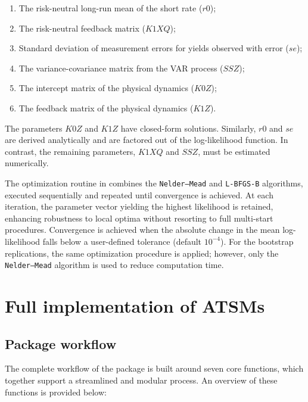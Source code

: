 \begin{enumerate}
\def\labelenumi{\arabic{enumi}.}
\item
  The risk-neutral long-run mean of the short rate (\(r0\));
\item
  The risk-neutral feedback matrix (\(K1XQ\));
\item
  Standard deviation of measurement errors for yields observed with error (\(se\));
\item
  The variance-covariance matrix from the VAR process (\(SSZ\));
\item
  The intercept matrix of the physical dynamics (\(K0Z\));
\item
  The feedback matrix of the physical dynamics (\(K1Z\)).
\end{enumerate}

The parameters \(K0Z\) and \(K1Z\) have closed-form solutions. Similarly, \(r0\) and \(se\) are derived analytically and are factored out of the log-likelihood function. In contrast, the remaining parameters, \(K1XQ\) and \(SSZ\), must be estimated numerically.

The optimization routine in  combines the \texttt{Nelder–Mead} and \texttt{L-BFGS-B} algorithms, executed sequentially and repeated until convergence is achieved. At each iteration, the parameter vector yielding the highest likelihood is retained, enhancing robustness to local optima without resorting to full multi-start procedures. Convergence is achieved when the absolute change in the mean log-likelihood falls below a user-defined tolerance (default \(10^{-4}\)). For the bootstrap replications, the same optimization procedure is applied; however, only the \texttt{Nelder–Mead} algorithm is used to reduce computation time.

\section{Full implementation of ATSMs}\label{S:SectionImplementation}

\subsection{Package workflow}\label{package-workflow}

The complete workflow of the  package is built around seven core functions, which together support a streamlined and modular process. An overview of these functions is provided below:


